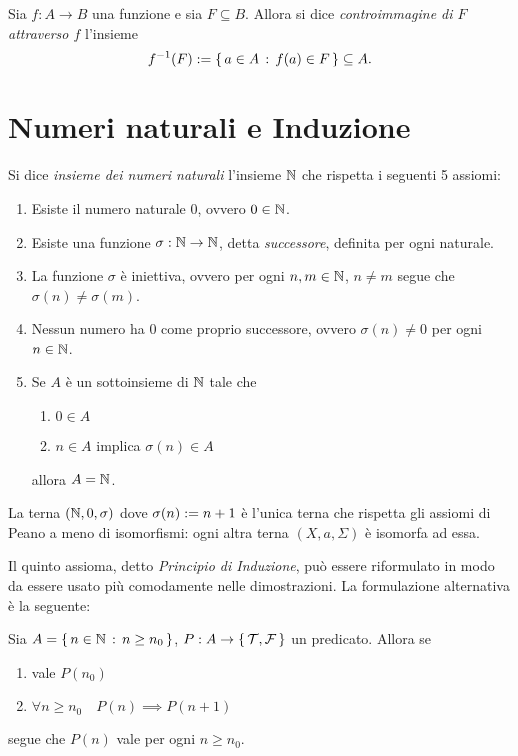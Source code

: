 \begin{definition}
    Sia $f : A \to B$ una funzione e sia $F \subseteq B$. Allora si dice \emph{controimmagine di $F$ attraverso $f$} l'insieme \[
        f^{-1}(F) := \left\{\,a \in A \,:\, f(a) \in F\,\right\} \subseteq A.    
    \]
\end{definition}

\section{Numeri naturali e Induzione}

\begin{unnamed}
    Si dice \emph{insieme dei numeri naturali} l'insieme $\mathbb{N}$ che rispetta i seguenti 5 assiomi: \begin{enumerate}[label={(P\arabic*)}, ref={(P\arabic*)}]
        \item Esiste il numero naturale $0$, ovvero $0 \in \mathbb{N}$.
        \item Esiste una funzione $\sigma : \mathbb{N} \to \mathbb{N}$, detta \emph{successore}, definita per ogni naturale.
        \item La funzione $\sigma$ è iniettiva, ovvero per ogni $n, m \in \mathbb{N}$, $n \neq m$ segue che $\sigma(n) \neq \sigma(m)$.
        \item Nessun numero ha $0$ come proprio successore, ovvero $\sigma(n) \neq 0$ per ogni $n \in \mathbb{N}$. 
        \item Se $A$ è un sottoinsieme di $\mathbb{N}$ tale che \begin{enumerate}
            \item $0 \in A$
            \item $n \in A$ implica $\sigma(n) \in A$
        \end{enumerate}
        allora $A = \mathbb{N}$.
    \end{enumerate}
\end{unnamed}

La terna $(\mathbb{N}, 0, \sigma)$ dove $\sigma(n) := n+1$ è l'unica terna che rispetta gli assiomi di Peano a meno di isomorfismi: ogni altra terna $(X, a, \Sigma)$ è isomorfa ad essa.

Il quinto assioma, detto \emph{Principio di Induzione}, può essere riformulato in modo da essere usato più comodamente nelle dimostrazioni. La formulazione alternativa è la seguente: 

\begin{unnamed}
    Sia $A = \left\{\,n \in \mathbb{N} \,:\, n \geq n_0\,\right\}$, $P : A \to \left\{\,\mathcal{T}, \mathcal{F}\,\right\}$ un predicato. Allora se \begin{enumerate}[label={(\roman*)}]
        \item vale $P(n_0)$
        \item $\forall n \geq n_0 \quad P(n) \implies P(n + 1)$
    \end{enumerate}
    segue che $P(n)$ vale per ogni $n \geq n_0$.
\end{unnamed}

